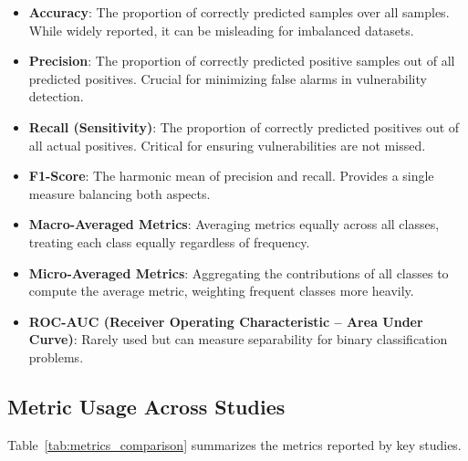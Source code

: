 \begin{itemize}
    \item \textbf{Accuracy}: The proportion of correctly predicted samples over all samples. While widely reported, it can be misleading for imbalanced datasets.
    
    \item \textbf{Precision}: The proportion of correctly predicted positive samples out of all predicted positives. Crucial for minimizing false alarms in vulnerability detection.
    
    \item \textbf{Recall (Sensitivity)}: The proportion of correctly predicted positives out of all actual positives. Critical for ensuring vulnerabilities are not missed.
    
    \item \textbf{F1-Score}: The harmonic mean of precision and recall. Provides a single measure balancing both aspects.
    
    \item \textbf{Macro-Averaged Metrics}: Averaging metrics equally across all classes, treating each class equally regardless of frequency.
    
    \item \textbf{Micro-Averaged Metrics}: Aggregating the contributions of all classes to compute the average metric, weighting frequent classes more heavily.
    
    \item \textbf{ROC-AUC (Receiver Operating Characteristic – Area Under Curve)}: Rarely used but can measure separability for binary classification problems.
\end{itemize}

\subsection*{Metric Usage Across Studies}

Table~\ref{tab:metrics_comparison} summarizes the metrics reported by key studies.

